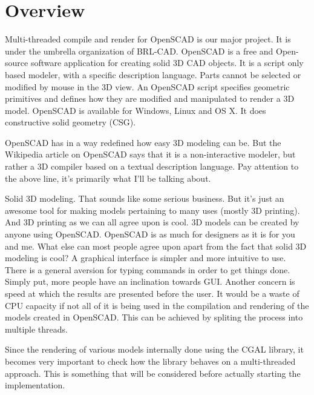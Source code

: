 \section{Overview}
Multi-threaded compile and render for OpenSCAD is our major project. It is under the umbrella organization of BRL-CAD. OpenSCAD is a free and Open-source software application for creating solid 3D CAD objects. It is a script only based modeler, with a specific description language. Parts cannot be selected or modified by mouse in the 3D view. An OpenSCAD script specifies geometric primitives and defines how they are modified and manipulated to render a 3D model. OpenSCAD is available for Windows, Linux and OS X. It does constructive solid geometry (CSG).

OpenSCAD has in a way redefined how easy 3D modeling can be. But the Wikipedia article on OpenSCAD says that it is a non-interactive modeler, but rather a 3D compiler based on a textual description language. Pay attention to the above line, it’s primarily what I’ll be talking about.

Solid 3D modeling. That sounds like some serious business. But it’s just an awesome tool for making models pertaining to many uses (mostly 3D printing). And 3D printing as we can all agree upon is cool. 3D models can be created by anyone using OpenSCAD. OpenSCAD is as much for designers as it is for you and me. What else can most people agree upon apart from the fact that solid 3D modeling is cool? A graphical interface is simpler and more intuitive to use. There is a general aversion for typing commands in order to get things done. Simply put, more people have an inclination towards GUI. Another concern is speed at which the results are presented before the user. It would be a waste of CPU capacity if not all of it is being used in the compilation and rendering of the models created in OpenSCAD. This can be achieved by spliting the process into multiple threads.

Since the rendering of various models internally done using the CGAL library, it becomes very important to check how the library behaves on a multi-threaded approach. This is something that will be considered before actually starting the implementation.

